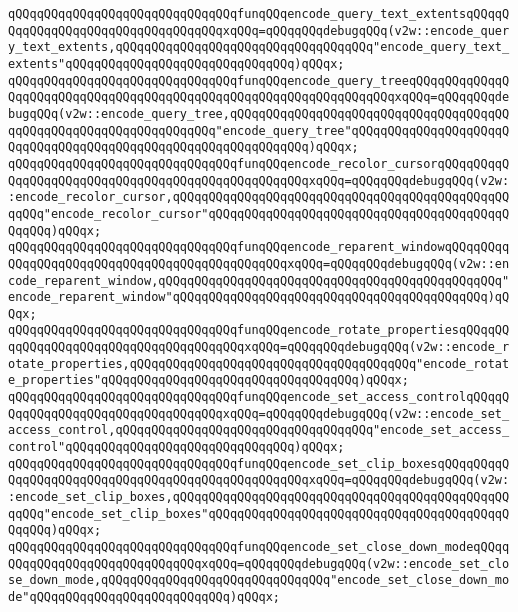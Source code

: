 \verb|qQQqqQQqqQQqqQQqqQQqqQQqqQQqqQQqfunqQQqencode_query_text_extentsqQQqqQQqqQQqqQQqqQQqqQQqqQQqqQQqqQQqxqQQq=qQQqqQQqdebugqQQq(v2w::encode_query_text_extents,qQQqqQQqqQQqqQQqqQQqqQQqqQQqqQQqqQQq"encode_query_text_extents"qQQqqQQqqQQqqQQqqQQqqQQqqQQqqQQq)qQQqx;|\newline
\verb|qQQqqQQqqQQqqQQqqQQqqQQqqQQqqQQqfunqQQqencode_query_treeqQQqqQQqqQQqqQQqqQQqqQQqqQQqqQQqqQQqqQQqqQQqqQQqqQQqqQQqqQQqqQQqqQQqxqQQq=qQQqqQQqdebugqQQq(v2w::encode_query_tree,qQQqqQQqqQQqqQQqqQQqqQQqqQQqqQQqqQQqqQQqqQQqqQQqqQQqqQQqqQQqqQQqqQQq"encode_query_tree"qQQqqQQqqQQqqQQqqQQqqQQqqQQqqQQqqQQqqQQqqQQqqQQqqQQqqQQqqQQqqQQq)qQQqx;|\newline
\verb|qQQqqQQqqQQqqQQqqQQqqQQqqQQqqQQqfunqQQqencode_recolor_cursorqQQqqQQqqQQqqQQqqQQqqQQqqQQqqQQqqQQqqQQqqQQqqQQqqQQqxqQQq=qQQqqQQqdebugqQQq(v2w::encode_recolor_cursor,qQQqqQQqqQQqqQQqqQQqqQQqqQQqqQQqqQQqqQQqqQQqqQQqqQQq"encode_recolor_cursor"qQQqqQQqqQQqqQQqqQQqqQQqqQQqqQQqqQQqqQQqqQQqqQQq)qQQqx;|\newline
\verb|qQQqqQQqqQQqqQQqqQQqqQQqqQQqqQQqfunqQQqencode_reparent_windowqQQqqQQqqQQqqQQqqQQqqQQqqQQqqQQqqQQqqQQqqQQqqQQqxqQQq=qQQqqQQqdebugqQQq(v2w::encode_reparent_window,qQQqqQQqqQQqqQQqqQQqqQQqqQQqqQQqqQQqqQQqqQQqqQQq"encode_reparent_window"qQQqqQQqqQQqqQQqqQQqqQQqqQQqqQQqqQQqqQQqqQQq)qQQqx;|\newline
\verb|qQQqqQQqqQQqqQQqqQQqqQQqqQQqqQQqfunqQQqencode_rotate_propertiesqQQqqQQqqQQqqQQqqQQqqQQqqQQqqQQqqQQqqQQqxqQQq=qQQqqQQqdebugqQQq(v2w::encode_rotate_properties,qQQqqQQqqQQqqQQqqQQqqQQqqQQqqQQqqQQqqQQq"encode_rotate_properties"qQQqqQQqqQQqqQQqqQQqqQQqqQQqqQQqqQQq)qQQqx;|\newline
\verb|qQQqqQQqqQQqqQQqqQQqqQQqqQQqqQQqfunqQQqencode_set_access_controlqQQqqQQqqQQqqQQqqQQqqQQqqQQqqQQqqQQqxqQQq=qQQqqQQqdebugqQQq(v2w::encode_set_access_control,qQQqqQQqqQQqqQQqqQQqqQQqqQQqqQQqqQQq"encode_set_access_control"qQQqqQQqqQQqqQQqqQQqqQQqqQQqqQQq)qQQqx;|\newline
\verb|qQQqqQQqqQQqqQQqqQQqqQQqqQQqqQQqfunqQQqencode_set_clip_boxesqQQqqQQqqQQqqQQqqQQqqQQqqQQqqQQqqQQqqQQqqQQqqQQqqQQqxqQQq=qQQqqQQqdebugqQQq(v2w::encode_set_clip_boxes,qQQqqQQqqQQqqQQqqQQqqQQqqQQqqQQqqQQqqQQqqQQqqQQqqQQq"encode_set_clip_boxes"qQQqqQQqqQQqqQQqqQQqqQQqqQQqqQQqqQQqqQQqqQQqqQQq)qQQqx;|\newline
\verb|qQQqqQQqqQQqqQQqqQQqqQQqqQQqqQQqfunqQQqencode_set_close_down_modeqQQqqQQqqQQqqQQqqQQqqQQqqQQqqQQqxqQQq=qQQqqQQqdebugqQQq(v2w::encode_set_close_down_mode,qQQqqQQqqQQqqQQqqQQqqQQqqQQqqQQq"encode_set_close_down_mode"qQQqqQQqqQQqqQQqqQQqqQQqqQQq)qQQqx;|\newline
